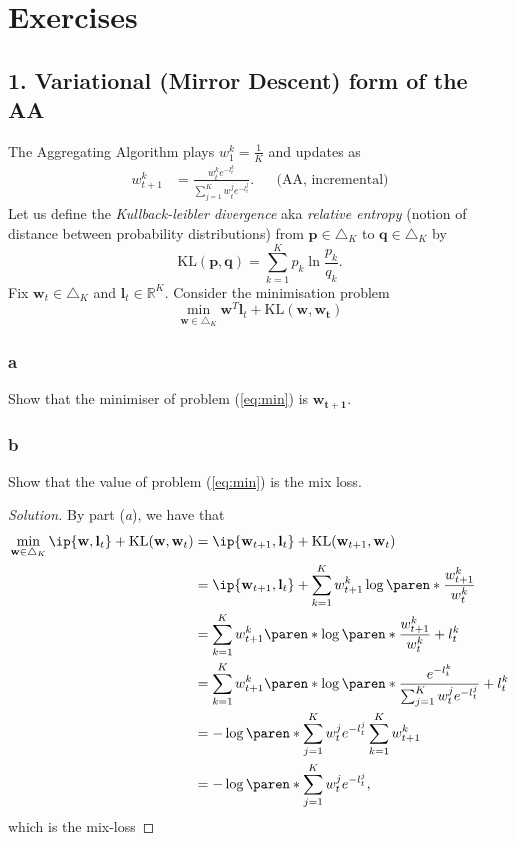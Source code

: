 \documentclass[10pt, a4paper, twoside]{amsart}
\theoremstyle{plain}
\newcommand{\R}{\ensuremath{\mathbb{R}}}
\DeclarePairedDelimiter\paren()
\DeclarePairedDelimiter{\ip}\langle\rangle
\newcommand{\bw}{\ensuremath{\mathbf{w}}} %
\newcommand{\bl}{\ensuremath{\mathbf{l}}} %
\newenvironment{solution}
               {\let\oldqedsymbol=\qedsymbol
                \renewcommand{\qedsymbol}{$\blacktriangleleft$}
                \begin{proof}[Solution]}
               {\end{proof}
                \renewcommand{\qedsymbol}{\oldqedsymbol}}
\begin{document}
\section{Exercises}
\subsection*{1. Variational (Mirror Descent) form of the AA}
The Aggregating Algorithm plays $w_1^k = \frac{1}{K}$ and updates as
\begin{align*}
    w_{t+1}^k &= \frac{w_t^k e^{-l_t^k}}{\sum_{j=1}^K w_t^j e^{-l_t^j}}. &&\mbox{(AA, incremental)}
\end{align*}
Let us define the \textit{Kullback-leibler divergence} aka \textit{relative entropy} (notion of distance between probability distributions) from $\mathbf{p} \in \triangle_K$ to $\mathbf{q} \in \triangle_K$ by
\begin{equation*}
    \mbox{KL}(\mathbf{p}, \mathbf{q}) = \sum_{k=1}^K p_k \ln \frac{p_k}{q_k}.
\end{equation*}
Fix $\mathbf{w}_t \in \triangle_K$ and $\mathbf{l}_t \in \R^K$. Consider the minimisation problem 
\begin{equation} \label{eq:min}
    \min_{\mathbf{w} \in \triangle_K} \mathbf{w}^T\mathbf{l}_t + \mbox{KL}(\mathbf{w}, \mathbf{w_t})
\end{equation}
\subsubsection*{a}
Show that the minimiser of problem (\ref{eq:min}) is $\mathbf{w_{t+1}}$.
\subsubsection*{b}
Show that the value of problem (\ref{eq:min}) is the mix loss.
\begin{solution} 
 By part (\textit{a}), we have that
 \begin{align*}
  \min_{\bw \in \triangle_{K}} \ip{\bw,\bl_t} + \mathrm{KL}(\bw,\bw_t) 
  &= \ip{\bw_{t+1},\bl_t} + \mathrm{KL}(\bw_{t+1},\bw_t) \\
  &= \ip{\bw_{t+1},\bl_t} + \sum_{k=1}^K w_{t+1}^{k} \log\paren*{\frac{w_{t+1}^{k}}{w_{t}^{k}}} \\
  &= \sum_{k=1}^K w_{t+1}^{k} \paren*{\log\paren*{\frac{w_{t+1}^{k}}{w_{t}^{k}}} + l_t^k} \\
  &= \sum_{k=1}^K w_{t+1}^{k} \paren*{\log\paren*{\frac{e^{-l_t^k}}{\sum_{j=1}^K w_t^j e^{-l_t^j}}} + l_t^k} \\
  &= -\log\paren*{\sum_{j=1}^K w_t^j e^{-l_t^j}}\sum_{k=1}^K w_{t+1}^{k}  \\
  &= -\log\paren*{\sum_{j=1}^K w_t^j e^{-l_t^j}},
 \end{align*}
which is the mix-loss
\end{solution}
\end{document}
